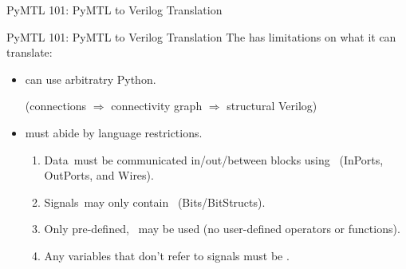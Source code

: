 \begin{frame}{PyMTL 101: PyMTL to Verilog Translation}
\vspace{0.3in}
\end{frame}

\begin{frame}{PyMTL 101: PyMTL to Verilog Translation}
The  has limitations on what it can translate:

\smallskip
\begin{itemize}
  \item {} can use arbitratry Python.

        (connections $\Rightarrow$ connectivity graph $\Rightarrow$
         structural Verilog)

  \smallskip
  \item {} must abide by language restrictions.

  \pause
  \smallskip
  \begin{enumerate}
    \item Data must be communicated in/out/between blocks
          using  (InPorts, OutPorts, and Wires).
    \smallskip
    \item Signals may only contain 
          (Bits/BitStructs).
    \smallskip
    \item Only pre-defined,  may be
          used (no user-defined operators or functions).
    \smallskip
    \item Any variables that don't refer to signals must be .
  \end{enumerate}
\end{itemize}
\end{frame}

